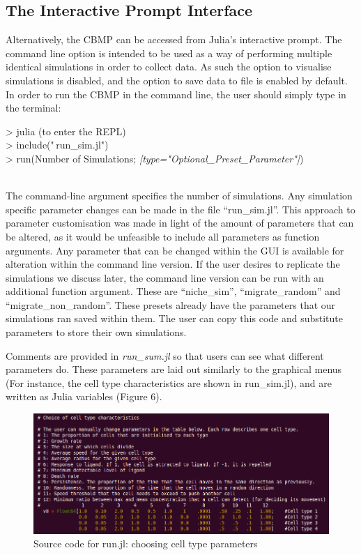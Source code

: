 \documentclass[12pt]{article}
\begin{document}
\subsection{The Interactive Prompt Interface}
Alternatively, the CBMP can be accessed from Julia's interactive prompt. 
The command line option is intended to be used as a way of performing 
multiple identical simulations in order to collect data. As such the 
option to visualise simulations is disabled, and the option to save data 
to file is enabled by default. In order to run the CBMP in the command 
line, the user should simply type in the terminal: \\

{\fontsize{11pt}{11pt} \ttfamily 

> julia (to enter the REPL) \\

> include("\,run\_sim.jl") \\

> run(Number of Simulations; {\itshape[type="Optional\_Preset\_Parameter"]})}\\

The command-line argument specifies the number of simulations. Any 
simulation specific parameter changes can be made in the file 
``run\_sim.jl''. This approach to parameter customisation was made in 
light of the amount of parameters that can be altered, as it would be 
unfeasible to include all parameters as function arguments. Any 
parameter that can be changed within the GUI is available for alteration 
within the command line version. If the user desires to replicate the 
simulations we discuss later, the command line version can be run with 
an additional function argument. These are ``niche\_sim'', ``migrate\_random'' 
and ``migrate\_non\_random''. These presets already have the parameters 
that our simulations ran saved within them. The user can copy this code 
and substitute parameters to store their own simulations.

Comments are provided in {\itshape run\_sum.jl} so that users can see 
what different parameters do. These parameters are laid out similarly to 
the graphical menus (For instance, the cell type characteristics are 
shown in run\_sim.jl), and are written as Julia variables (Figure 6).

\begin{figure}[H]
\centering
\includegraphics[width=\textwidth]{media/runsim.png}
\caption[]{Source code for run.jl: choosing cell type parameters}
\end{figure}
\end{document}
